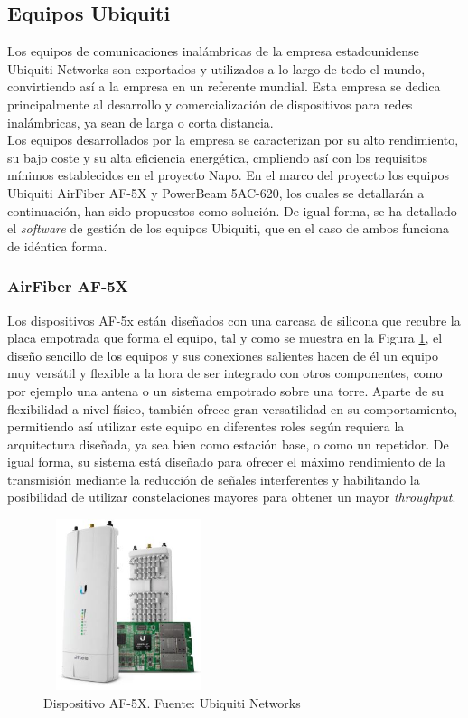 \subsection{Equipos Ubiquiti}
Los equipos de  comunicaciones inalámbricas de la empresa estadounidense Ubiquiti Networks \cite{Ubiquiti} son exportados y utilizados a lo largo de todo el mundo, convirtiendo así a la empresa en un referente mundial. Esta empresa se dedica principalmente al desarrollo y comercialización de dispositivos para redes inalámbricas, ya sean de larga o corta distancia. \\

Los equipos desarrollados por la empresa se caracterizan por su alto rendimiento, su bajo coste y su alta eficiencia energética, cmpliendo así con los requisitos mínimos establecidos en el proyecto Napo. En el marco del proyecto los equipos Ubiquiti AirFiber AF-5X y PowerBeam 5AC-620, los cuales se detallarán a continuación, han sido propuestos como solución. De igual forma, se ha detallado el \textit{software} de gestión de los equipos Ubiquiti, que en el caso de ambos funciona de idéntica forma.

\subsubsection{AirFiber AF-5X}
Los dispositivos AF-5x están diseñados con una carcasa de silicona que recubre la placa empotrada que forma el equipo, tal y como se muestra en la Figura \ref{af_5x}, el diseño sencillo de los equipos y sus conexiones salientes hacen de él un equipo muy versátil y flexible a la hora de ser integrado con otros componentes, como por ejemplo una antena o un sistema empotrado sobre una torre. Aparte de su flexibilidad a nivel físico, también ofrece gran versatilidad en su comportamiento, permitiendo así utilizar este equipo en diferentes roles según requiera la arquitectura diseñada, ya sea bien como estación base, o como un repetidor. De igual forma, su sistema está diseñado para ofrecer el máximo rendimiento de la transmisión mediante la reducción de señales interferentes y habilitando la posibilidad de utilizar constelaciones mayores para obtener un mayor \textit{throughput}.

\begin{figure}[H]
		\centering
		\includegraphics[width=5cm,height=5cm]{img/af_5x.JPG}
		\caption{Dispositivo AF-5X. Fuente: Ubiquiti Networks}
		\label{af_5x}
	\end{figure}

